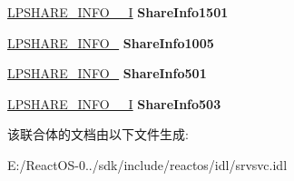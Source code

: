 \begin{DoxyCompactItemize}
\mbox{\label{union___s_h_a_r_e___i_n_f_o_a2ee7d187e18a4e93d41ff97e0e167bcd}} 
\hyperlink{struct___s_h_a_r_e___i_n_f_o__1501___i}{L\+P\+S\+H\+A\+R\+E\+\_\+\+I\+N\+F\+O\+\_\+\_\+I} {\bfseries Share\+Info1501}
\item 
\mbox{\label{union___s_h_a_r_e___i_n_f_o_a458e87ce3e13d16d9914d8d6b9f1c499}} 
\hyperlink{struct___s_h_a_r_e___i_n_f_o__1005}{L\+P\+S\+H\+A\+R\+E\+\_\+\+I\+N\+F\+O\+\_} {\bfseries Share\+Info1005}
\item 
\mbox{\label{union___s_h_a_r_e___i_n_f_o_ac6a663cc547a75e5c9514c8946265dfc}} 
\hyperlink{struct___s_h_a_r_e___i_n_f_o__501}{L\+P\+S\+H\+A\+R\+E\+\_\+\+I\+N\+F\+O\+\_} {\bfseries Share\+Info501}
\item 
\mbox{\label{union___s_h_a_r_e___i_n_f_o_ab1c46495d17d2d79f158a8c3704278db}} 
\hyperlink{struct___s_h_a_r_e___i_n_f_o__503___i}{L\+P\+S\+H\+A\+R\+E\+\_\+\+I\+N\+F\+O\+\_\+\_\+I} {\bfseries Share\+Info503}
\end{DoxyCompactItemize}


该联合体的文档由以下文件生成\+:\begin{DoxyCompactItemize}
\item 
E\+:/\+React\+O\+S-\/0../sdk/include/reactos/idl/srvsvc.\+idl\end{DoxyCompactItemize}
